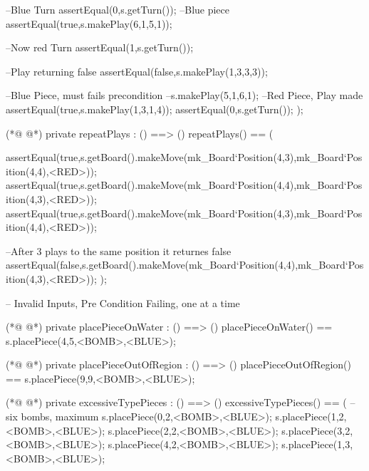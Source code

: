 \begin{vdmpp}[breaklines=true]
                 --Blue Turn
                 assertEqual(0,s.getTurn());
                 --Blue piece
                 assertEqual(true,s.makePlay(6,1,5,1));
                 
                 --Now red Turn
                 assertEqual(1,s.getTurn());
                 
                 --Play returning false
                 assertEqual(false,s.makePlay(1,3,3,3));
                 
                 --Blue Piece, must fails precondition
                 --s.makePlay(5,1,6,1);
                 --Red Piece, Play made
                 assertEqual(true,s.makePlay(1,3,1,4));
                 assertEqual(0,s.getTurn());
                );
                
(*@
\label{repeatPlays:196}
@*)
                private repeatPlays : () ==> ()
                repeatPlays() == (
                
                  
                  assertEqual(true,s.getBoard().makeMove(mk_Board`Position(4,3),mk_Board`Position(4,4),<RED>));
                  assertEqual(true,s.getBoard().makeMove(mk_Board`Position(4,4),mk_Board`Position(4,3),<RED>));
                  assertEqual(true,s.getBoard().makeMove(mk_Board`Position(4,3),mk_Board`Position(4,4),<RED>));
                  
                  --After 3 plays to the same position it returnes false
                  assertEqual(false,s.getBoard().makeMove(mk_Board`Position(4,4),mk_Board`Position(4,3),<RED>));
                );
                
                
                
                -- Invalid Inputs, Pre Condition Failing, one at a time
                
(*@
\label{placePieceOnWater:212}
@*)
                private placePieceOnWater : () ==> ()
                placePieceOnWater() == s.placePiece(4,5,<BOMB>,<BLUE>);
                
(*@
\label{placePieceOutOfRegion:215}
@*)
                private placePieceOutOfRegion : () ==> ()
                placePieceOutOfRegion() == s.placePiece(9,9,<BOMB>,<BLUE>);
                
(*@
\label{excessiveTypePieces:218}
@*)
                private excessiveTypePieces : () ==> ()
                excessiveTypePieces() == (
                -- six bombs, maximum
                s.placePiece(0,2,<BOMB>,<BLUE>);
                s.placePiece(1,2,<BOMB>,<BLUE>);
                s.placePiece(2,2,<BOMB>,<BLUE>);
                s.placePiece(3,2,<BOMB>,<BLUE>);
                s.placePiece(4,2,<BOMB>,<BLUE>);
             s.placePiece(1,3,<BOMB>,<BLUE>);
                

\end{vdmpp}
